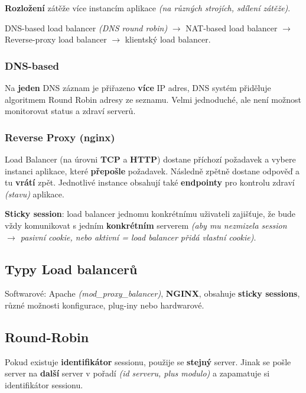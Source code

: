 \textbf{Rozložení} zátěže více instancím aplikace \textit{(na různých strojích, sdílení zátěže)}.

\vspace{4pt}
\noindent DNS-based load balancer \textit{(DNS round robin)} $\to$ NAT-based load balancer $\to$ Reverse-proxy load balancer $\to$ klientský load balancer.

\subsubsection*{DNS-based}

Na \textbf{jeden} DNS záznam je přiřazeno \textbf{více} IP adres, DNS systém přiděluje algoritmem Round Robin adresy ze seznamu. Velmi jednoduché, ale není možnost monitorovat status a zdraví serverů.

\subsubsection*{Reverse Proxy (nginx)}

Load Balancer (na úrovni \textbf{TCP} a \textbf{HTTP}) dostane příchozí požadavek a vybere instanci aplikace, které \textbf{přepošle} požadavek. Následně zpětně dostane odpověď a tu \textbf{vrátí} zpět. Jednotlivé instance obsahují také \textbf{endpointy} pro kontrolu zdraví \textit{(stavu)} aplikace.

\textbf{Sticky session}: load balancer jednomu konkrétnímu uživateli zajišťuje, že bude vždy komunikovat s jedním \textbf{konkrétním} serverem \textit{(aby mu nezmizela session $\to$ pasivní cookie, nebo aktivní = load balancer přidá vlastní cookie)}.

\subsection{Typy Load balancerů}

Softwarové: Apache \textit{(mod\_proxy\_balancer)}, \textbf{NGINX}, obsahuje \textbf{sticky sessions}, různé možnosti konfigurace, plug-iny nebo hardwarové.

\subsection{Round-Robin}

Pokud existuje \textbf{identifikátor} sessionu, použije se \textbf{stejný} server. Jinak se pošle server na \textbf{další} server v pořadí \textit{(id serveru, plus modulo)} a zapamatuje si identifikátor sessionu.

